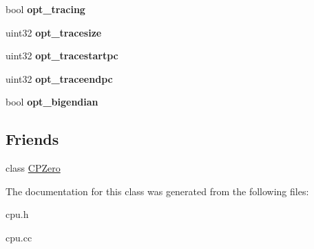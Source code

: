 \begin{DoxyCompactItemize}
\item 
\hypertarget{classCPU_a71cb0088ee9232425f0d91b2515e63c7}{
bool {\bfseries opt\_\-tracing}}
\label{classCPU_a71cb0088ee9232425f0d91b2515e63c7}

\item 
\hypertarget{classCPU_ad4b5995ace46f91553d1587748bce505}{
uint32 {\bfseries opt\_\-tracesize}}
\label{classCPU_ad4b5995ace46f91553d1587748bce505}

\item 
\hypertarget{classCPU_af9bf7995b16fdb0835c5ab6b6ab615d5}{
uint32 {\bfseries opt\_\-tracestartpc}}
\label{classCPU_af9bf7995b16fdb0835c5ab6b6ab615d5}

\item 
\hypertarget{classCPU_a9f48aa68d5317676ff8f433fe5605149}{
uint32 {\bfseries opt\_\-traceendpc}}
\label{classCPU_a9f48aa68d5317676ff8f433fe5605149}

\item 
\hypertarget{classCPU_a72f0d1686f2261398e815a9e5658de69}{
bool {\bfseries opt\_\-bigendian}}
\label{classCPU_a72f0d1686f2261398e815a9e5658de69}

\end{DoxyCompactItemize}
\subsection*{Friends}
\begin{DoxyCompactItemize}
\item 
\hypertarget{classCPU_ae03ffac5ee6974e43cec96baf6063c70}{
class \hyperlink{classCPU_ae03ffac5ee6974e43cec96baf6063c70}{CPZero}}
\label{classCPU_ae03ffac5ee6974e43cec96baf6063c70}

\end{DoxyCompactItemize}


The documentation for this class was generated from the following files:\begin{DoxyCompactItemize}
\item 
cpu.h\item 
cpu.cc\end{DoxyCompactItemize}
